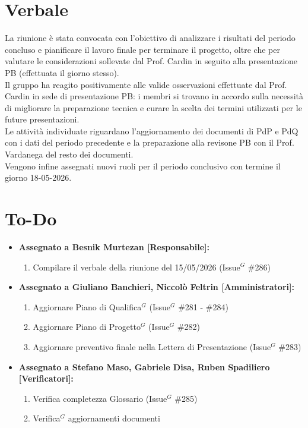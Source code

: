 \documentclass[a4paper,10pt]{article}
\begin{document}
\section*{Verbale}

La riunione è stata convocata con l’obiettivo di analizzare i risultati del periodo concluso e pianificare il lavoro finale per terminare il progetto, oltre che per valutare le considerazioni sollevate dal Prof. Cardin in seguito alla presentazione PB (effettuata il giorno stesso).\\

Il gruppo ha reagito positivamente alle valide osservazioni effettuate dal Prof. Cardin in sede di presentazione PB: i membri si trovano in accordo sulla necessità di migliorare la preparazione tecnica e curare la scelta dei termini utilizzati per le future presentazioni.\\

Le attività individuate riguardano l'aggiornamento dei documenti di PdP e PdQ con i dati del periodo precedente e la preparazione alla revisone PB con il Prof. Vardanega del resto dei documenti.\\

Vengono infine assegnati nuovi ruoli per il periodo conclusivo con termine il giorno 18-05-2026.

\section*{To-Do}
\begin{itemize}
\item \textbf{Assegnato a Besnik Murtezan [Responsabile]:}
    \begin{enumerate}
    \item Compilare il verbale della riunione del 15/05/2026 (Issue$^G$ \#286)
    \end{enumerate}
\item \textbf{Assegnato a Giuliano Banchieri, Niccolò Feltrin [Amministratori]:}
        \begin{enumerate}
        \item Aggiornare Piano di Qualifica$^G$ (Issue$^G$ \#281 - \#284)
        \item Aggiornare Piano di Progetto$^G$ (Issue$^G$ \#282)
        \item Aggiornare preventivo finale nella Lettera di Presentazione (Issue$^G$ \#283) 
        \end{enumerate}
\item \textbf{Assegnato a Stefano Maso, Gabriele Disa, Ruben Spadiliero [Verificatori]:}
    \begin{enumerate}
    \item Verifica completezza Glossario (Issue$^G$ \#285)
    \item Verifica$^G$ aggiornamenti documenti
  \end{enumerate}
\end{itemize}
\end{document}
